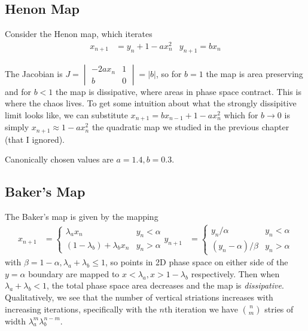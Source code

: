 \documentclass[12pt]{article}
\begin{document}
\subsection{Henon Map}

Consider the Henon map, which iterates
\begin{align}
    x_{n+1} &= y_n + 1 - ax_n^2 & y_{n+1} = bx_n
\end{align}

The Jacobian is $J =
\begin{vmatrix}
    -2ax_n & 1\\
    b & 0
\end{vmatrix} = |b|$, so for $b=1$ the map is area preserving and for $b < 1$
the map is dissipative, where areas in phase space contract. This is where the
chaos lives. To get some intuition about what the strongly dissipitive limit
looks like, we can substitute $x_{n+1} = bx_{n-1} + 1 - ax_n^2$ which for $b \to
0$ is simply $x_{n+1} \approx 1 - ax_n^2$ the quadratic map we studied in the
previous chapter (that I ignored).

Canonically chosen values are $a = 1.4, b = 0.3$.

\subsection{Baker's Map}

The Baker's map is given by the mapping
\begin{align}
    x_{n+1} &=
    \begin{cases}
        \lambda_a x_n & y_n < \alpha\\
        (1 - \lambda_b) + \lambda_b x_n & y_n > \alpha
    \end{cases}
    y_{n+1} &=
    \begin{cases}
        y_n/\alpha & y_n < \alpha\\
        (y_n - \alpha) / \beta & y_n > \alpha
    \end{cases}
\end{align}
with $\beta = 1-\alpha, \lambda_a + \lambda_b \leq 1$, so points in 2D phase
space on either side of the $y=\alpha$ boundary are mapped to $x < \lambda_a, x
> 1-\lambda_b$ respectively. Then when $\lambda_a + \lambda_b < 1$, the total
phase space area decreases and the map is \emph{dissipative}. Qualitatively, we
see that the number of vertical striations increases with increasing iterations,
specifically with the $n$th iteration we have $\binom{n}{m}$ stries of width
$\lambda_a^m\lambda_b^{n-m}$.
\end{document}
